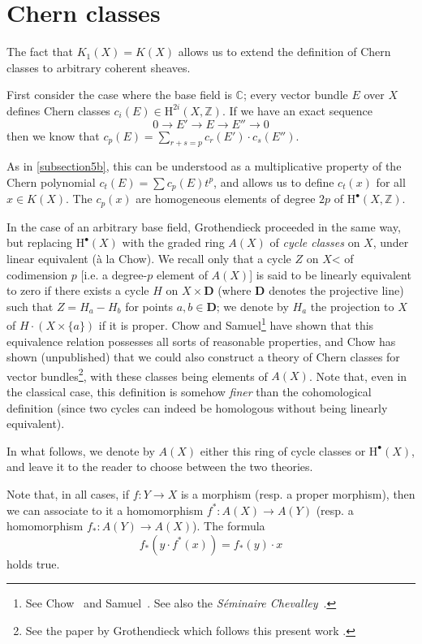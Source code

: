 \documentclass{article}
\theoremstyle{plain}
\theoremstyle{definition}
\newcommand{\HH}{\mathrm{H}}
\newcommand{\oldpage}[1]{\marginpar{\footnotesize$\Big\vert$ \textit{p.~#1}}}
\begin{document}
\section{Chern classes}
\label{section6}

The fact that $K_1(X)=K(X)$ allows us to extend the definition of Chern classes to arbitrary coherent sheaves.

First consider the case where the base field is $\mathbb{C}$;
every vector bundle $E$ over $X$ defines Chern classes $c_i(E)\in\HH^{2i}(X,\mathbb{Z})$.
If we have an exact sequence
\[
  0\to E'\to E\to E''\to0
\]
then we know that $c_p(E)=\sum_{r+s=p}c_r(E')\cdot c_s(E'')$.

As in \cref{subsection5b}, this can be understood as a multiplicative property of the Chern polynomial $c_t(E)=\sum c_p(E)t^p$, and allows us to define $c_t(x)$ for all $x\in K(X)$.
The $c_p(x)$ are homogeneous elements of degree $2p$ of $\HH^\bullet(X,\mathbb{Z})$.

In the case of an arbitrary base field, Grothendieck proceeded in the same way, but replacing $\HH^\bullet(X)$ with the graded ring $A(X)$ of \emph{cycle classes} on $X$, under linear equivalent (à la Chow).
We recall only that a cycle $Z$ on $X$< of codimension $p$ [i.e. a degree-$p$ element of $A(X)$] is said to be linearly equivalent to zero if there exists a cycle $H$ on $X\times\mathbf{D}$ (where $\mathbf{D}$ denotes the projective line) such that $Z=H_a-H_b$ for points $a,b\in\mathbf{D}$;
we denote by $H_a$ the projection to $X$ of $H\cdot(X\times\{a\})$ if it is proper.
Chow and Samuel\footnote{See Chow~\cite{5} and Samuel~\cite{10}. See also the \emph{S\'{e}minaire Chevalley}~\cite{11}.} have shown that
\oldpage{112}
this equivalence relation possesses all sorts of reasonable properties, and Chow has shown (unpublished) that we could also construct a theory of Chern classes for vector bundles\footnote{See the paper by Grothendieck which follows this present work \cite{8}.}, with these classes being elements of $A(X)$.
Note that, even in the classical case, this definition is somehow \emph{finer} than the cohomological definition (since two cycles can indeed be homologous without being linearly equivalent).

In what follows, we denote by $A(X)$ either this ring of cycle classes or $\HH^\bullet(X)$, and leave it to the reader to choose between the two theories.

Note that, in all cases, if $f\colon Y\to X$ is a morphism (resp. a proper morphism), then we can associate to it a homomorphism $f^*\colon A(X)\to A(Y)$ (resp. a homomorphism $f_*\colon A(Y)\to A(X)$).
The formula
\[
  f_*(y\cdot f^*(x)) = f_*(y)\cdot x
\]
holds true.
\end{document}
